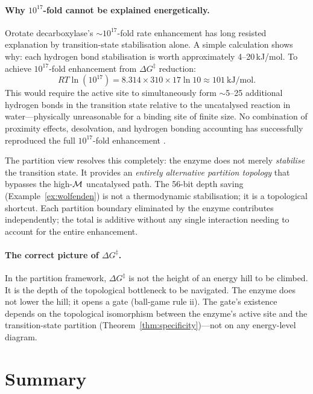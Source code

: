 \paragraph{Why $10^{17}$-fold cannot be explained energetically.}
Orotate decarboxylase's $\sim 10^{17}$-fold rate enhancement has long resisted
explanation by transition-state stabilisation alone. A simple calculation shows
why: each hydrogen bond stabilisation is worth approximately 4--20\,kJ/mol.
To achieve $10^{17}$-fold enhancement from $\Delta G^\ddagger$ reduction:
\begin{equation}
  RT \ln(10^{17}) = 8.314 \times 310 \times 17 \ln 10 \approx 101\ \mathrm{kJ/mol}.
\end{equation}
This would require the active site to simultaneously form $\sim$5--25 additional
hydrogen bonds in the transition state relative to the uncatalysed reaction
in water---physically unreasonable for a binding site of finite size. No
combination of proximity effects, desolvation, and hydrogen bonding accounting
has successfully reproduced the full $10^{17}$-fold enhancement
\citep{Wolfenden2001}.

The partition view resolves this completely: the enzyme does not merely
\emph{stabilise} the transition state. It provides an \emph{entirely
alternative partition topology} that bypasses the high-$\mathcal{M}$ uncatalysed
path. The 56-bit depth saving (Example~\ref{ex:wolfenden}) is not a
thermodynamic stabilisation; it is a topological shortcut. Each partition
boundary eliminated by the enzyme contributes independently; the total is
additive without any single interaction needing to account for the entire
enhancement.

\paragraph{The correct picture of $\Delta G^\ddagger$.}
In the partition framework, $\Delta G^\ddagger$ is not the height of an
energy hill to be climbed. It is the depth of the topological bottleneck
to be navigated. The enzyme does not lower the hill; it opens a gate
(ball-game rule ii). The gate's existence depends on the topological
isomorphism between the enzyme's active site and the transition-state
partition (Theorem~\ref{thm:specificity})---not on any energy-level diagram.

\section{Summary}
\label{sec:enzyme_summary}

